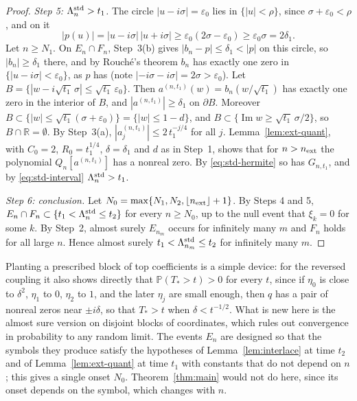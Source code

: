\documentclass[11pt]{amsart}
\theoremstyle{definition}
\theoremstyle{remark}
\numberwithin{equation}{section}
\newcommand{\R}{\mathbb{R}}
\newcommand{\PP}{\mathbb{P}}
\newcommand{\eps}{\varepsilon}
\DeclareMathOperator{\im}{Im}
\begin{document}
\begin{proof}
\emph{Step 5: $\Lambda_n^{\rm std}>t_1$.} The circle $|u-i\sigma|=\eps_0$ lies in $\{|u|<\rho\}$, since $\sigma+\eps_0<\rho$, and on it
\[
|p(u)|=|u-i\sigma|\,|u+i\sigma|\ge\eps_0(2\sigma-\eps_0)\ge\eps_0\sigma=2\delta_1 .
\]
Let $n\ge N_1$. On $E_n\cap F_n$, Step~3(b) gives $|b_n-p|\le\delta_1<|p|$ on this circle, so $|b_n|\ge\delta_1$ there, and by Rouch\'e's theorem $b_n$ has exactly one zero in $\{|u-i\sigma|<\eps_0\}$, as $p$ has (note $|{-i\sigma}-i\sigma|=2\sigma>\eps_0$). Let $B=\{|w-i\sqrt{t_1}\,\sigma|\le\sqrt{t_1}\,\eps_0\}$. Then $a^{(n,t_1)}(w)=b_n(w/\sqrt{t_1})$ has exactly one zero in the interior of $B$, and $|a^{(n,t_1)}|\ge\delta_1$ on $\partial B$. Moreover $B\subset\{|w|\le\sqrt{t_1}(\sigma+\eps_0)\}=\{|w|\le1-d\}$, and $B\subset\{\im w\ge\sqrt{t_1}\,\sigma/2\}$, so $B\cap\R=\emptyset$. By Step~3(a), $|a^{(n,t_1)}_j|\le2\,t_1^{-j/4}$ for all $j$. Lemma~\ref{lem:ext-quant}, with $C_0=2$, $R_0=t_1^{1/4}$, $\delta=\delta_1$ and $d$ as in Step~1, shows that for $n>n_{\rm ext}$ the polynomial $Q_n[a^{(n,t_1)}]$ has a nonreal zero. By \eqref{eq:std-hermite} so has $G_{n,t_1}$, and by \eqref{eq:std-interval} $\Lambda_n^{\rm std}>t_1$.

\emph{Step 6: conclusion.} Let $N_0=\max\{N_1,N_2,\lfloor n_{\rm ext}\rfloor+1\}$. By Steps 4 and 5, $E_n\cap F_n\subset\{t_1<\Lambda_n^{\rm std}\le t_2\}$ for every $n\ge N_0$, up to the null event that $\xi_k=0$ for some $k$. By Step~2, almost surely $E_{n_m}$ occurs for infinitely many $m$ and $F_n$ holds for all large $n$. Hence almost surely $t_1<\Lambda_{n_m}^{\rm std}\le t_2$ for infinitely many $m$.
\end{proof}

Planting a prescribed block of top coefficients is a simple device: for the reversed coupling it also shows directly that $\PP(T_*>t)>0$ for every $t$, since if $\eta_0$ is close to $\delta^2$, $\eta_1$ to $0$, $\eta_2$ to $1$, and the later $\eta_j$ are small enough, then $q$ has a pair of nonreal zeros near $\pm i\delta$, so that $T_*>t$ when $\delta<t^{-1/2}$. What is new here is the almost sure version on disjoint blocks of coordinates, which rules out convergence in probability to any random limit. The events $E_n$ are designed so that the symbols they produce satisfy the hypotheses of Lemma~\ref{lem:interlace} at time $t_2$ and of Lemma~\ref{lem:ext-quant} at time $t_1$ with constants that do not depend on $n$; this gives a single onset $N_0$. Theorem~\ref{thm:main} would not do here, since its onset depends on the symbol, which changes with $n$.
\end{document}
